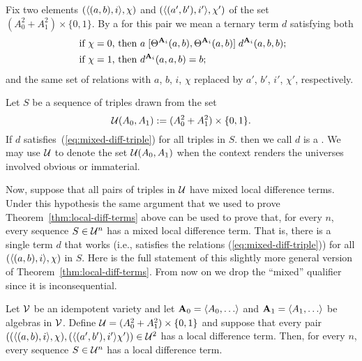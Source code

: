 Fix two elements $(\langle(a, b),i\rangle, \chi)$ and $(\langle(a', b'),i'\rangle, \chi')$ of the
set $(A_0^2 + A_1^2) \times \{0,1\}$.
By a  for this pair
we mean a ternary term $d$ satisfying both
\begin{align}
\text{ if $\chi=0$, then } & a \comm{\Cg^{\bA_i}(a,b)}{\Cg^{\bA_i}(a,b)} d^{\bA_i}(a,b,b); \label{eq:mixed-diff-triple}\\
\text{ if $\chi=1$, then } &d^{\bA_i}(a,a,b) = b; \nonumber
\end{align}
and the same set of relations with $a$, $b$, $i$, $\chi$ replaced 
by $a'$, $b'$, $i'$, $\chi'$, respectively.

Let $S$ be a sequence of triples drawn from the set
\[
\mathcal{U}(A_0, A_1)  := (A_0^2 + A_1^2) \times \{0,1\}.
\]
If $d$ satisfies~(\ref{eq:mixed-diff-triple}) for all triples in $S$.
then we call $d$ is a .
We may use $\mathcal{U}$ to denote the set $\mathcal{U}(A_0, A_1)$ when the context renders the
universes involved obvious or immaterial.

Now, suppose that all pairs of triples 
in $\mathcal{U}$ have mixed local difference terms.
Under this hypothesis the same argument that we used to prove
Theorem~\ref{thm:local-diff-terms} above can be used to prove that, for every $n$,
every sequence $S\in \mathcal{U}^n$ has a mixed local difference term.
That is, there is a single term $d$ that works (i.e., satisfies
the relations (\ref{eq:mixed-diff-triple})) for all $(\langle(a, b), i\rangle,\chi)$ in $S$.
Here is the full statement of this slightly more general version of
Theorem~\ref{thm:local-diff-terms}.
From now on we drop the ``mixed'' qualifier since
it is inconsequential.

\begin{thm} %
  \label{thm:mixed-local-diff-terms}
  Let $\mathcal{V}$ be an idempotent variety and let
  $\bA_0 = \<A_0, \dots\>$ and   $\bA_1 = \<A_1, \dots\>$ be algebras in $\mathcal{V}$. Define
  $\mathcal{U}  = (A_0^2 + A_1^2)\times \{0,1\}$
  and suppose that every pair
  $((\langle(a, b), i\rangle, \chi), (\langle(a', b'), i'\rangle\chi')) \in \mathcal{U}^2$
  has a local difference term. Then, for every $n$, every sequence $S \in \mathcal{U}^n$
  has a local difference term.
\end{thm}

